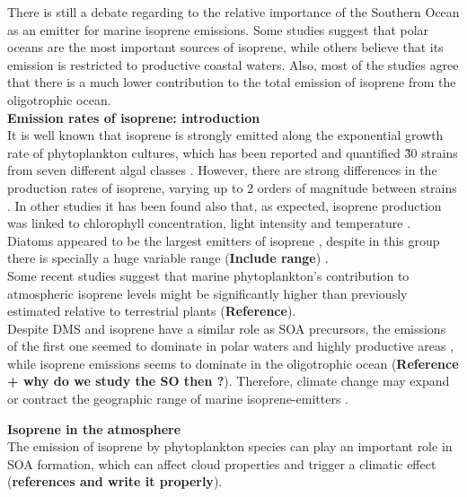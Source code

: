 \documentclass[draft,linenumbers]{agujournal}
\begin{document}
There is still a debate regarding to the relative importance of the Southern Ocean as an emitter for marine isoprene emissions. Some studies suggest that polar oceans are the most important sources of isoprene, while others believe that its emission is restricted to productive coastal waters. Also, most of the studies agree that there is a much lower contribution to the total emission of isoprene from the oligotrophic ocean.\\

\textbf{Emission rates of isoprene: introduction}\\

It is well known that isoprene is strongly emitted along the exponential growth rate of phytoplankton cultures\citep{exton2013chlorophyll}, which has been reported and quantified \~30 strains from seven different algal classes \citep{booge2016can}. However, there are strong differences in the production rates of isoprene, varying up to 2 orders of magnitude between strains \citep{exton2013chlorophyll}. In other studies it has been found also that, as expected, isoprene production was linked to chlorophyll concentration, light intensity and temperature \citep{shaw2003isoprene,shaw2010production}. Diatoms appeared to be the largest emitters of isoprene \citep{gantt2009new, exton2013chlorophyll}, despite in this group there is specially a huge variable range (\textbf{Include range}) \citep{shaw2010production,li2017distribution}.\\

Some recent studies \citep{dani2017relationship} suggest that marine phytoplankton's contribution to atmospheric isoprene levels might be significantly higher than previously estimated relative to terrestrial plants (\textbf{Reference}). \\

Despite DMS and isoprene have a similar role as SOA precursors, the emissions of the first one seemed to dominate in polar waters and highly productive areas , while isoprene emissions seems to dominate in the oligotrophic ocean (\textbf{Reference + why do we study the SO then ?}). Therefore, climate change may expand or contract the geographic range of marine isoprene-emitters \citep{dani2017trade}.

\textbf{Isoprene in the atmosphere}\\

The emission of isoprene by phytoplankton species can play an important role in SOA formation, which can affect cloud properties and trigger a climatic effect (\textbf{references and write it properly}).\\
\end{document}
